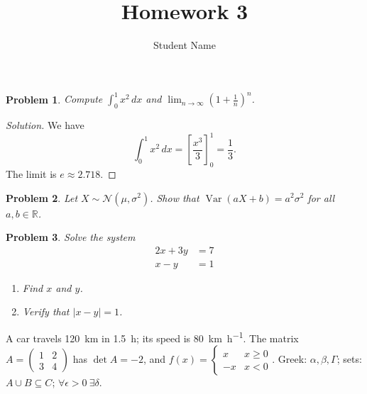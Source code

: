 \documentclass{article}
\title{Homework 3}
\author{Student Name}
\date{}
\newcommand{\abs}[1]{\left| #1 \right|}
\DeclareMathOperator{\Var}{Var}
\newenvironment{solution}{\begin{proof}[Solution]}{\end{proof}}
\newtheorem{problem}{Problem}
\begin{document}
\maketitle

\begin{problem}
Compute $\int_0^1 x^2\,dx$ and $\lim_{n\to\infty} (1 + \frac{1}{n})^n$.
\end{problem}
\begin{solution}
We have
\[ \int_0^1 x^2\,dx = \left[\frac{x^3}{3}\right]_0^1 = \frac{1}{3}. \]
The limit is $e \approx 2.718$.
\end{solution}

\begin{problem}
Let $X \sim \mathcal{N}(\mu, \sigma^2)$. Show that $\Var(aX + b) = a^2 \sigma^2$ for all $a, b \in \mathbb{R}$.
\end{problem}

\begin{problem}
Solve the system
\begin{align*}
  2x + 3y &= 7 \\
  x - y &= 1
\end{align*}
\begin{enumerate}[label=(\alph*)]
  \item Find $x$ and $y$.
  \item Verify that $\abs{x - y} = 1$.
\end{enumerate}
\end{problem}

A car travels \SI{120}{\kilo\meter} in \SI{1.5}{\hour}; its speed is \SI{80}{\kilo\meter\per\hour}.
The matrix $A = \begin{pmatrix} 1 & 2 \\ 3 & 4 \end{pmatrix}$ has $\det A = -2$, and
$f(x) = \begin{cases} x & x \geq 0 \\ -x & x < 0 \end{cases}$.
Greek: $\alpha, \beta, \Gamma$; sets: $A \cup B \subseteq C$; $\forall \epsilon > 0\ \exists \delta$.
\end{document}
